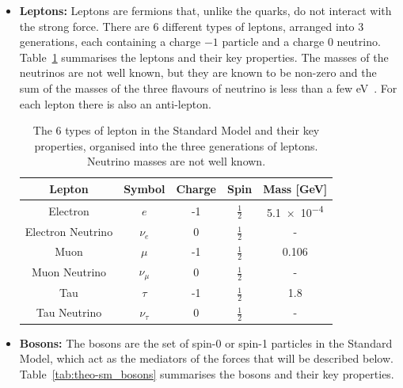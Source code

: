 \begin{itemize}[leftmargin=*]
\item\textbf{Leptons:}
  Leptons are fermions that, unlike the quarks, do not interact with the strong force.
  There are 6 different types of leptons,
  arranged into  3 generations, each containing a charge $-1$ particle and a charge 0 neutrino.
  Table~\ref{tab:theo-sm_leptons} summarises the leptons and their key properties.
  The masses of the neutrinos are not well known, but they are known to be non-zero
  and the sum of the masses of the three flavours of neutrino is less than a few eV~\cite{theo-nu_mass}.
  For each lepton there is also an anti-lepton.
  
  {\renewcommand{\arraystretch}{1.5}
  \begin{table}[!ht]
  \begin{center}
    \begin{tabular}{|c||c|c|c|c|}
      \hline
    Lepton            & Symbol        & Charge  &  Spin           &  Mass [GeV]\\
    \hline
    Electron          &   $e$         &  -1    &  $\frac{1}{2}$   &  \num{5.1e-4}\\
    Electron Neutrino &   $\nu_e$     &  0     &  $\frac{1}{2}$   &  -\\
    \hline                                   
    Muon              &   $\mu$       &  -1    &  $\frac{1}{2}$   &  0.106 \\
    Muon Neutrino     &   $\nu_{\mu}$  &  0     &  $\frac{1}{2}$   &  -\\
    \hline                                      
    Tau               &   $\tau$       &  -1   &  $\frac{1}{2}$   &  1.8\\
    Tau Neutrino      &   $\nu_{\tau}$  &  0    &  $\frac{1}{2}$   &  -\\
    \hline  
  \end{tabular}
    \caption{The 6 types of lepton in the Standard Model and their key properties,
    organised into the three generations of leptons. Neutrino masses are not well known. }
  \label{tab:theo-sm_leptons}
  \end{center}
  \end{table}}
 
\item\textbf{Bosons:}
  The bosons are the set of spin-0 or spin-1 particles in the Standard Model,
  which act as the mediators of the forces that will be described below.
  Table~\ref{tab:theo-sm_bosons} summarises the bosons and their key properties.


\end{itemize}

